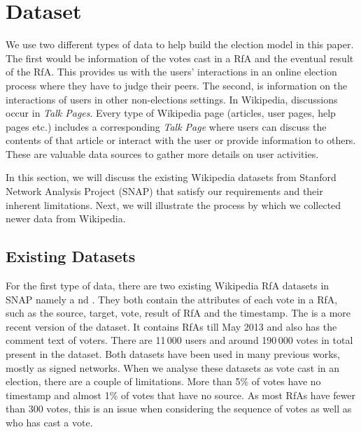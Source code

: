 \section{Dataset}
\label{sec:dataset}

We use two different types of data to help build the election model in this paper. The first would be information of the votes cast in a RfA and the eventual result of the RfA. This provides us with the users' interactions in an online election process where they have to judge their peers. The second, is information on the interactions of users in other non-elections settings. In Wikipedia, discussions occur in \textit{Talk Pages}. Every type of Wikipedia page (articles, user pages, help pages etc.) includes a corresponding \textit{Talk Page} where users can discuss the contents of that article or interact with the user or provide information to others. These are valuable data sources to gather more details on user activities.

In this section, we will discuss the existing Wikipedia datasets from Stanford Network Analysis Project (SNAP) \cite{snapnets} that satisfy our requirements and their inherent limitations. Next, we will illustrate the process by which we collected newer data from Wikipedia.


\subsection{Existing Datasets}
For the first type of data, there are two existing Wikipedia RfA datasets in SNAP namely \wikielect a
nd \wikirfa. They both contain the attributes of each vote in a RfA, such as the source, target, vote, result of RfA and the timestamp. The \wikirfa is a more recent version of the \wikielect dataset. It contains RfAs till May 2013 and also has the comment text of voters. There are 11\,000 users and around 190\,000 votes in total present in the dataset. Both datasets have been used in many previous works, mostly as signed networks. When we analyse these datasets as vote cast in an election, there are a couple of limitations. More than 5\% of \wikirfa votes have no timestamp and almost 1\% of votes that have no source. As most RfAs have fewer than 300 votes, this is an issue when considering the sequence of votes as well as who has cast a vote.

